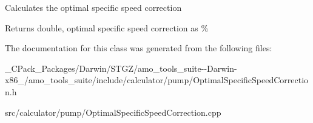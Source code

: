 Calculates the optimal specific speed correction

\begin{DoxyReturn}{Returns}
double, optimal specific speed correction as \% 
\end{DoxyReturn}


The documentation for this class was generated from the following files\+:\begin{DoxyCompactItemize}
\item 
\+\_\+\+C\+Pack\+\_\+\+Packages/\+Darwin/\+S\+T\+G\+Z/amo\+\_\+tools\+\_\+suite-\/-\/\+Darwin-\/x86\+\_/amo\+\_\+tools\+\_\+suite/include/calculator/pump/Optimal\+Specific\+Speed\+Correction.\+h\item 
src/calculator/pump/Optimal\+Specific\+Speed\+Correction.\+cpp\end{DoxyCompactItemize}
